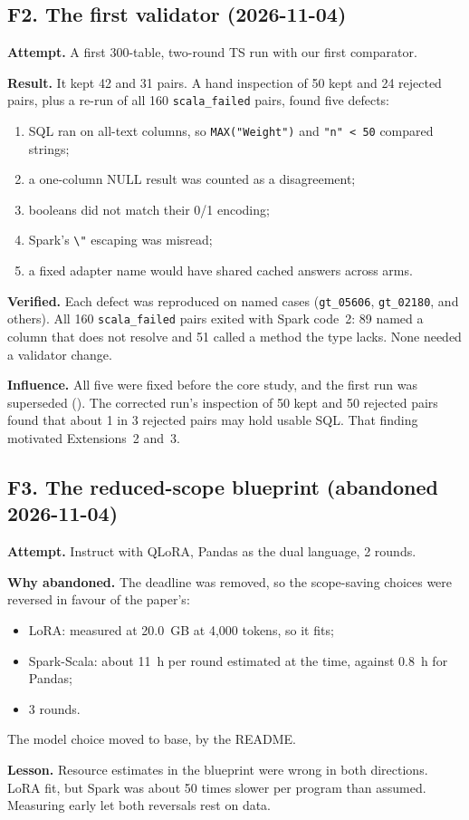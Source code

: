 \subsection{F2. The first validator (2026-11-04)}\label{sec:fail-validator}
\begin{failbox}{}
\textbf{Attempt.} A first 300-table, two-round TS run with our first comparator.

\textbf{Result.} It kept 42 and 31 pairs. A hand inspection of 50 kept and 24 rejected pairs, plus a re-run of all
160 \texttt{scala\_failed} pairs, found five defects:
\begin{enumerate}
\item SQL ran on all-text columns, so \texttt{MAX("Weight")} and \texttt{"n" < 50} compared strings;
\item a one-column NULL result was counted as a disagreement;
\item booleans did not match their 0/1 encoding;
\item Spark's \texttt{\textbackslash"} escaping was misread;
\item a fixed adapter name would have shared cached answers across arms.
\end{enumerate}

\textbf{Verified.} Each defect was reproduced on named cases (\texttt{gt\_05606}, \texttt{gt\_02180}, and others).
All 160 \texttt{scala\_failed} pairs exited with Spark code~2: 89 named a column that does not resolve and 51 called a
method the type lacks. None needed a validator change.

\textbf{Influence.} All five were fixed before the core study, and the first run was superseded
(). The corrected run's inspection of 50 kept and 50 rejected pairs
found that about 1 in 3 rejected pairs may hold usable SQL. That finding motivated Extensions~2 and~3.
\end{failbox}

\subsection{F3. The reduced-scope blueprint (abandoned 2026-11-04)}
\begin{failbox}{}
\textbf{Attempt.} Instruct with QLoRA, Pandas as the dual language, 2 rounds.

\textbf{Why abandoned.} The deadline was removed, so the scope-saving choices were reversed in favour of the paper's:
\begin{itemize}
\item LoRA: measured at 20.0~GB at 4,000 tokens, so it fits;
\item Spark-Scala: about 11~h per round estimated at the time, against 0.8~h for Pandas;
\item 3 rounds.
\end{itemize}
The model choice moved to base, by the README.

\textbf{Lesson.} Resource estimates in the blueprint were wrong in both directions. LoRA fit, but Spark was about 50
times slower per program than assumed. Measuring early let both reversals rest on data.
\end{failbox}

